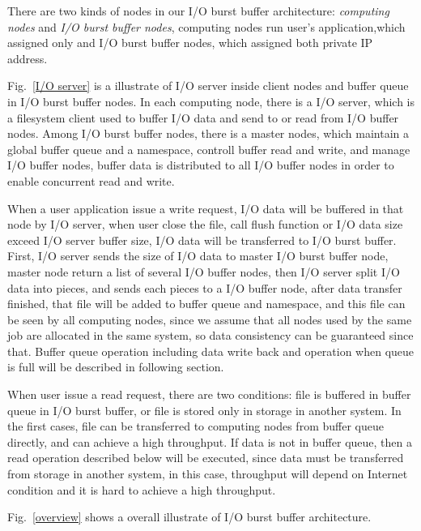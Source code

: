 There are two kinds of nodes in our I/O burst buffer architecture: \emph{computing nodes} and \emph{I/O burst buffer nodes}, computing nodes run user's application,which assigned only  and I/O burst buffer nodes, which assigned both private IP address.

Fig.~\ref{I/O server} is a illustrate of I/O server inside client nodes and buffer queue in I/O burst buffer nodes.
In each computing node, there is a I/O server, which is a filesystem client used to buffer I/O data and send to or read from I/O buffer nodes.
Among I/O burst buffer nodes, there is a master nodes, which maintain a global buffer queue and a namespace, controll buffer read and write, and manage I/O buffer nodes, buffer data is distributed to all I/O buffer nodes in order to enable concurrent read and write.

When a user application issue a write request, I/O data will be buffered in that node by I/O server, when user close the file, call flush function or I/O data size exceed I/O server buffer size, I/O data will be transferred to I/O burst buffer.
First, I/O server sends the size of I/O data to master I/O burst buffer node, master node return a list of several I/O buffer nodes, then I/O server split I/O data into pieces, and sends each pieces to a I/O buffer node, after data transfer finished, that file will be added to buffer queue and namespace, and this file can be seen by all computing nodes, since we assume that all nodes used by the same job are allocated in the same system, so data consistency can be guaranteed since that.
Buffer queue operation including data write back and operation when queue is full will be described in following section.

When user issue a read request, there are two conditions: file is buffered in buffer queue in I/O burst buffer, or file is stored only in storage in another system.
In the first cases, file can be transferred to computing nodes from buffer queue directly, and can achieve a high throughput.
If data is not in buffer queue, then a read operation described below will be executed, since data must be transferred from storage in another system, in this case, throughput will depend on Internet condition and it is hard to achieve a high throughput.

Fig.~\ref{overview} shows a overall illustrate of I/O burst buffer architecture.



